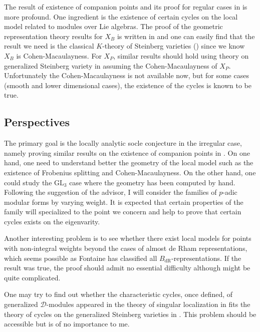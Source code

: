 \documentclass{amsart}
\newcommand{\GL}{\text{GL}}
\numberwithin{equation}{section}
\begin{document}
The result of existence of companion points and its proof for regular cases in \cite{breuil2019local} is more profound. One ingredient is the existence of certain cycles on the local model related to modules over Lie algebras. The proof of the geometric representation theory results for $X_B$ is written in \cite{riche2008geometric} and one can easily find that the result we need is the classical $K$-theory of Steinberg varieties (\cite{Chriss1997RepresentationTA}) since we know $X_B$ is Cohen-Macaulayness. For $X_P$, similar results should hold using theory on generalized Steinberg variety in \cite{douglass2014equivariant} assuming the Cohen-Macaulayness of $X_P$. Unfortunately the Cohen-Macaulayness is not available now, but for some cases (smooth and lower dimensional cases), the existence of the cycles is known to be true.
\subsection{Perspectives}
The primary goal is the locally analytic socle conjecture in the irregular case, namely proving similar results on the existence of companion points in \cite{breuil2019local}. On one hand, one need to understand better the geometry of the local model such as the existence of Frobenius splitting and Cohen-Macaulayness. On the other hand, one could study the $\GL_3$ case where the geometry has been computed by hand. Following the suggestion of the advisor, I will consider the families of $p$-adic modular forms by varying weight. It is expected that certain properties of the family will specialized to the point we concern and help to prove that certain cycles exists on the eigenvarity.\par
Another interesting problem is to see whether there exist local models for points with non-integral weights beyond the cases of almost de Rham representations, which seems possible as Fontaine has classified all $B_{\text{dR}}$-representations. If the result was true, the proof should admit no essential difficulty although might be quite complicated.\par
One may try to find out whether the characteristic cycles, once defined, of generalized $\mathcal{D}$-modules appeared in the theory of singular localization in \cite{Backelin2015singular} fits the theory of cycles on the generalized Steinberg varieties in \cite{douglass2014equivariant}. This problem should be accessible but is of no importance to me.


\end{document}
